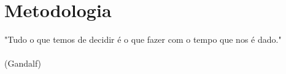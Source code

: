 \chapter{Metodologia}
\label{chap:meto}
\begin{flushright}
	"Tudo o que temos de decidir é o que fazer com o tempo que nos é dado." \\
	\ \\
	(Gandalf)
\end{flushright}